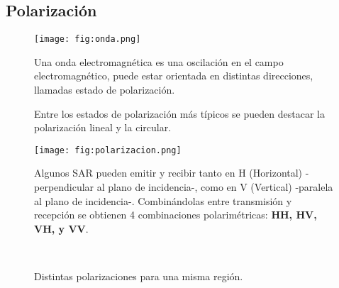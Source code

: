 \subsection{Polarización}

\begin{frame}{} \vskip0cm
  \begin{figure}
    \centering
    \texttt{[image: fig:onda.png]}
    \caption{Una onda electromagnética es una oscilación en el campo electromagnético, puede estar orientada en distintas direcciones, llamadas estado de polarización.}
    \label{}
  \end{figure}
\end{frame}

\begin{frame}{} \vskip0cm
  \begin{figure}
    \centering
    \caption{Entre los estados de polarización más típicos se pueden destacar la polarización lineal y la circular.}
    \label{}
  \end{figure}
\end{frame}



\begin{frame}{} \vskip0cm
  \begin{figure}
    \centering
    \texttt{[image: fig:polarizacion.png]}
    \caption{Algunos SAR pueden emitir y recibir tanto en H (Horizontal) -perpendicular al plano de incidencia-, como en V (Vertical) -paralela al plano de incidencia-. Combinándolas entre transmisión y recepción se obtienen 4 combinaciones polarimétricas: {\bf HH, HV, VH, y VV}.}
    \label{}
  \end{figure}
\end{frame}

\begin{frame}{} \vskip0cm
  \begin{figure}
    \centering
    \hspace{1cm}
    \\
    \hspace{1cm}
    \caption{Distintas polarizaciones para una misma región.}
  \end{figure}
\end{frame}

